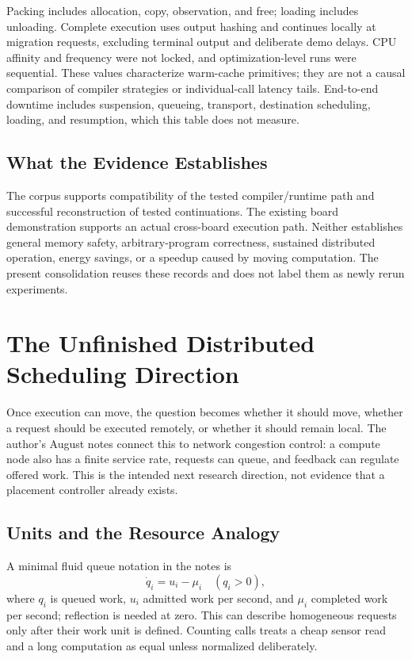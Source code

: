 \documentclass[conference,letterpaper]{IEEEtran}
\begin{document}
Packing includes allocation, copy, observation, and free; loading includes unloading. Complete execution uses output hashing and continues locally at migration requests, excluding terminal output and deliberate demo delays. CPU affinity and frequency were not locked, and optimization-level runs were sequential. These values characterize warm-cache primitives; they are not a causal comparison of compiler strategies or individual-call latency tails. End-to-end downtime includes suspension, queueing, transport, destination scheduling, loading, and resumption, which this table does not measure.

\subsection{What the Evidence Establishes}
The corpus supports compatibility of the tested compiler/runtime path and successful reconstruction of tested continuations. The existing board demonstration supports an actual cross-board execution path. Neither establishes general memory safety, arbitrary-program correctness, sustained distributed operation, energy savings, or a speedup caused by moving computation. The present consolidation reuses these records and does not label them as newly rerun experiments.

\section{The Unfinished Distributed Scheduling Direction}
Once execution can move, the question becomes whether it should move, whether a request should be executed remotely, or whether it should remain local. The author's August notes connect this to network congestion control: a compute node also has a finite service rate, requests can queue, and feedback can regulate offered work. This is the intended next research direction, not evidence that a placement controller already exists.

\subsection{Units and the Resource Analogy}
A minimal fluid queue notation in the notes is
\begin{equation}
\dot q_i=u_i-\mu_i\quad(q_i>0),
\end{equation}
where $q_i$ is queued work, $u_i$ admitted work per second, and $\mu_i$ completed work per second; reflection is needed at zero. This can describe homogeneous requests only after their work unit is defined. Counting calls treats a cheap sensor read and a long computation as equal unless normalized deliberately.
\end{document}
